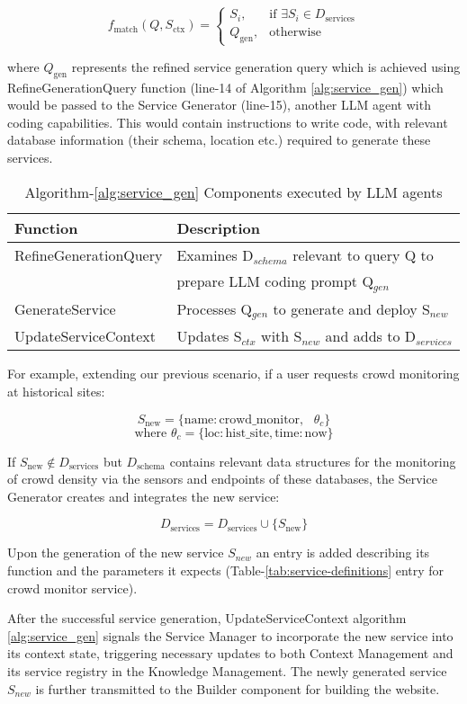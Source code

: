 \[
f_{\text{match}}(Q, S_{\text{ctx}}) = 
\begin{cases}
    S_i, & \text{if } \exists S_i \in D_{\text{services}} \\
    Q_{\text{gen}}, & \text{otherwise}
\end{cases}
\]


where $Q_{\text{gen}}$ represents the refined service generation query which is achieved using RefineGenerationQuery function (line-14 of Algorithm \ref{alg:service_gen}) which would be passed to the Service Generator (line-15), another LLM agent with coding capabilities. This would contain instructions to write code, with relevant database information (their schema, location etc.) required to generate these services. 

\begin{table}[h]
\setlength{\tabcolsep}{3pt}
\caption{Algorithm-\ref{alg:service_gen} Components executed by LLM agents}
\label{tab:service-gen-components}
\centering
\begin{tabular}{ll}
\toprule
\textbf{Function} & \textbf{Description} \\
\midrule
RefineGenerationQuery & Examines D$_{schema}$ relevant to query Q to \\
& prepare LLM coding prompt Q$_{gen}$ \\ \hline
GenerateService & Processes Q$_{gen}$ to generate and deploy S$_{new}$ \\ \hline
UpdateServiceContext & Updates S$_{ctx}$ with S$_{new}$ and adds to D$_{services}$ \\
\bottomrule
\end{tabular}
\end{table}
For example, extending our previous scenario, if a user requests crowd monitoring at historical sites:

\[
S_{\text{new}} = \{
    \text{name}: \text{crowd\_monitor}, \text{ } \theta_c
\}
\]
\[
\text{where } \theta_c = \{
    \text{loc}: \text{hist\_site},
    \text{time}: \text{now}
\}
\]


If $S_{\text{new}} \notin D_{\text{services}}$ but $D_{\text{schema}}$ contains relevant data structures for the monitoring of crowd density via the sensors and endpoints of these databases, the Service Generator creates and integrates the new service:


\[
D_{\text{services}} = D_{\text{services}} \cup \{S_{\text{new}}\}
\]

Upon the generation of the new service $S_{new}$ an entry is added describing its function and the parameters it expects  (Table-\ref{tab:service-definitions} entry for crowd monitor service).

    
    
 After the successful service generation, UpdateServiceContext algorithm \ref{alg:service_gen} signals the Service Manager
 to incorporate the new service into its context state, triggering
 necessary updates to both Context Management and its
 service registry in the Knowledge Management. The newly generated service $S_{new}$ is further transmitted to the Builder component for building the website.

